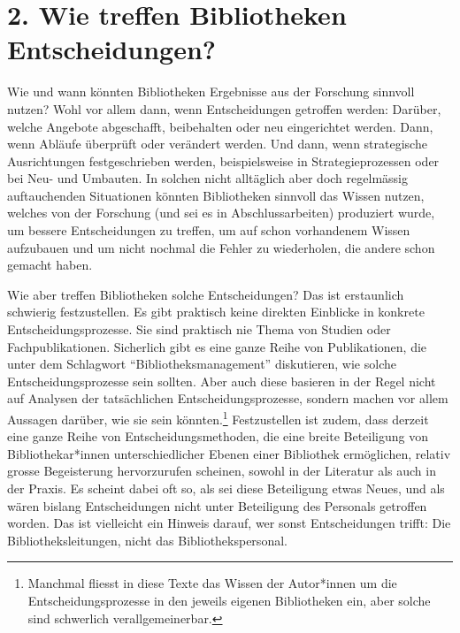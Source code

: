 \documentclass[a4paper,
fontsize=11pt,
oneside,
numbers=noperiodatend,
parskip=half-,
bibliography=totoc,
final
]{scrartcl}
\begin{document}
\hypertarget{wie-treffen-bibliotheken-entscheidungen}{%
\section{2. Wie treffen Bibliotheken
Entscheidungen?}\label{wie-treffen-bibliotheken-entscheidungen}}

Wie und wann könnten Bibliotheken Ergebnisse aus der Forschung sinnvoll
nutzen? Wohl vor allem dann, wenn Entscheidungen getroffen werden:
Darüber, welche Angebote abgeschafft, beibehalten oder neu eingerichtet
werden. Dann, wenn Abläufe überprüft oder verändert werden. Und dann,
wenn strategische Ausrichtungen festgeschrieben werden, beispielsweise
in Strategieprozessen oder bei Neu- und Umbauten. In solchen nicht
alltäglich aber doch regelmässig auftauchenden Situationen könnten
Bibliotheken sinnvoll das Wissen nutzen, welches von der Forschung (und
sei es in Abschlussarbeiten) produziert wurde, um bessere Entscheidungen
zu treffen, um auf schon vorhandenem Wissen aufzubauen und um nicht
nochmal die Fehler zu wiederholen, die andere schon gemacht haben.

Wie aber treffen Bibliotheken solche Entscheidungen? Das ist erstaunlich
schwierig festzustellen. Es gibt praktisch keine direkten Einblicke in
konkrete Entscheidungsprozesse. Sie sind praktisch nie Thema von Studien
oder Fachpublikationen. Sicherlich gibt es eine ganze Reihe von
Publikationen, die unter dem Schlagwort \enquote{Bibliotheksmanagement}
diskutieren, wie solche Entscheidungsprozesse sein sollten. Aber auch
diese basieren in der Regel nicht auf Analysen der tatsächlichen
Entscheidungsprozesse, sondern machen vor allem Aussagen darüber, wie
sie sein könnten.\footnote{Manchmal fliesst in diese Texte das Wissen
  der Autor*innen um die Entscheidungsprozesse in den jeweils eigenen
  Bibliotheken ein, aber solche sind schwerlich verallgemeinerbar.}
Festzustellen ist zudem, dass derzeit eine ganze Reihe von
Entscheidungsmethoden, die eine breite Beteiligung von
Bibliothekar*innen unterschiedlicher Ebenen einer Bibliothek
ermöglichen, relativ grosse Begeisterung hervorzurufen scheinen, sowohl
in der Literatur als auch in der Praxis. Es scheint dabei oft so, als
sei diese Beteiligung etwas Neues, und als wären bislang Entscheidungen
nicht unter Beteiligung des Personals getroffen worden. Das ist
vielleicht ein Hinweis darauf, wer sonst Entscheidungen trifft: Die
Bibliotheksleitungen, nicht das Bibliothekspersonal.
\end{document}
